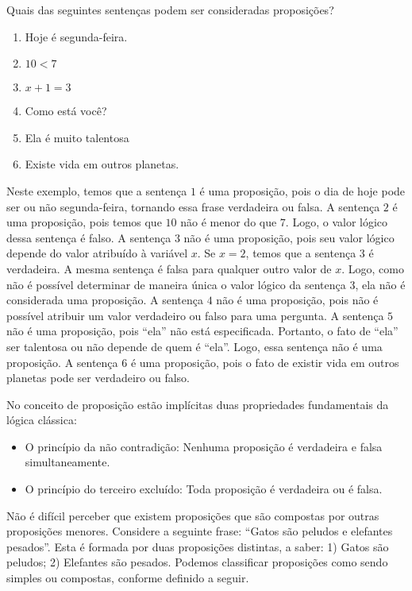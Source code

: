 \begin{Example}
  Quais das seguintes senten\c{c}as podem ser consideradas proposi\c{c}\~oes?
  \begin{enumerate}
    \item Hoje \'e segunda-feira.
    \item $10 < 7$
    \item $x + 1 = 3$
    \item Como est\'a voc\^e?
    \item Ela \'e muito talentosa
    \item Existe vida em outros planetas.
  \end{enumerate}
  Neste exemplo, temos que a senten\c{c}a $1$ \'e uma proposi\c{c}\~ao, pois o dia de hoje pode ser ou n\~ao segunda-feira, tornando essa frase
  verdadeira ou falsa. A senten\c{c}a $2$ \'e uma proposi\c{c}\~ao, pois temos que $10$ n\~ao \'e menor do que $7$. Logo, o valor l\'ogico dessa
  senten\c{c}a \'e  falso. A senten\c{c}a $3$ n\~ao \'e uma proposi\c{c}\~ao, pois seu valor l\'ogico depende do valor atribu\'ido à
  vari\'avel $x$. Se $x = 2$, temos que a senten\c{c}a $3$ \'e verdadeira. A mesma senten\c{c}a \'e falsa para qualquer outro valor de $x$.
  Logo, como n\~ao \'e poss\'ivel determinar de maneira \'unica o valor l\'ogico da senten\c{c}a $3$, ela n\~ao \'e considerada uma
  proposi\c{c}\~ao.
  A senten\c{c}a $4$ n\~ao \'e uma proposi\c{c}\~ao, pois n\~ao \'e poss\'ivel atribuir um valor verdadeiro ou falso para uma pergunta.
  A senten\c{c}a $5$ n\~ao \'e uma proposi\c{c}\~ao, pois ``ela'' n\~ao est\'a especificada. Portanto, o fato de ``ela'' ser talentosa ou n\~ao
  depende de quem \'e ``ela''. Logo, essa senten\c{c}a n\~ao \'e uma proposi\c{c}\~ao.
  A senten\c{c}a $6$ \'e uma proposi\c{c}\~ao, pois o fato de existir vida em outros planetas pode ser verdadeiro ou falso.
\end{Example}

No conceito de proposi\c{c}\~ao est\~ao impl\'icitas duas propriedades fundamentais da l\'ogica cl\'assica:
\begin{itemize}
  \item O princ\'ipio da n\~ao contradi\c{c}\~ao: Nenhuma proposi\c{c}\~ao \'e verdadeira e falsa simultaneamente.
  \item O princ\'ipio do terceiro exclu\'ido: Toda proposi\c{c}\~ao \'e verdadeira ou é falsa.
\end{itemize}

N\~ao \'e dif\'icil perceber que existem proposi\c{c}\~oes que s\~ao compostas por outras proposi\c{c}\~oes menores. Considere a
seguinte frase: ``Gatos s\~ao peludos e elefantes pesados''. Esta \'e formada por duas proposi\c{c}\~oes distintas, a saber: 1) Gatos s\~ao peludos;
2) Elefantes s\~ao pesados. Podemos classificar proposi\c{c}\~oes como sendo simples ou compostas, conforme definido a seguir.


